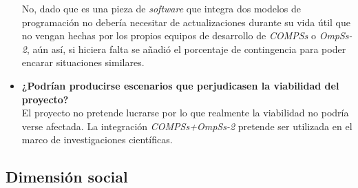 \begin{itemize}
	No, dado que es una pieza de \textit{software} que integra dos modelos de programación no debería necesitar de actualizaciones durante su vida útil que no vengan hechas por los propios equipos de desarrollo de \textit{COMPSs} o \textit{OmpSs-2}, aún así, si hiciera falta se añadió el porcentaje de contingencia para poder encarar situaciones similares.
	
	\item \textbf{¿Podrían producirse escenarios que perjudicasen la viabilidad del proyecto?} \\
	
	El proyecto no pretende lucrarse por lo que realmente la viabilidad no podría verse afectada. La integración \textit{COMPSs+OmpSs-2} pretende ser utilizada en el marco de investigaciones científicas.
	
\end{itemize}

\subsection{Dimensión social}

